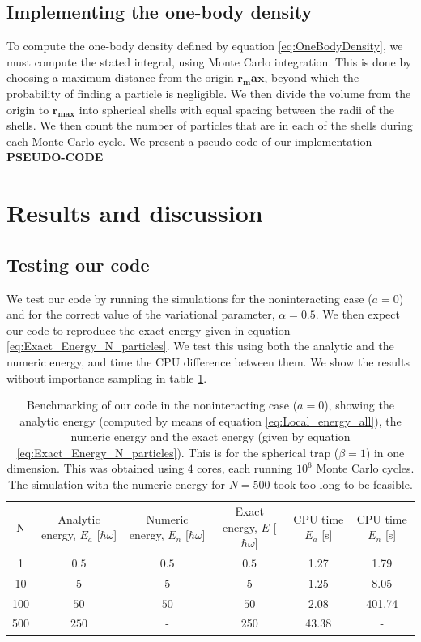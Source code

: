 \documentclass[a4paper, 10pt]{article}
\begin{document}
	\subsection{Implementing the one-body density}\label{sec:MetOneBody}
	To compute the one-body density defined by equation \ref{eq:OneBodyDensity}, we must compute the stated integral, using Monte Carlo integration. This is done by choosing a maximum distance from the origin $\boldsymbol{r_max}$, beyond which the probability of finding a particle is negligible. We then divide the volume from the origin to $\boldsymbol{r_{max}}$ into spherical shells with equal spacing between the radii of the shells. We then count the number of particles that are in each of the shells during each Monte Carlo cycle. We present a pseudo-code of our implementation \textbf{PSEUDO-CODE}	
	
	\section{Results and discussion}
	\subsection{Testing our code}
	We test our code by running the simulations for the noninteracting case ($a=0$) and for the correct value of the variational parameter, $\alpha=0.5$. We then expect our code to reproduce the exact energy given in equation \ref{eq:Exact_Energy_N_particles}. We test this using both the analytic and the numeric energy, and time the CPU difference between them. We show the results without importance sampling in table \ref{tab:4.1_benchmark_no_Green}.
	\begin{table}[ht!]
		\begin{adjustwidth}{-2cm}{}
			\begin{tabular}{cccccc}
				N & Analytic energy, $E_a$ [$\hbar \omega$] & Numeric energy, $E_n$ [$\hbar \omega$] & Exact energy, $E$ [$\hbar \omega$]& CPU time $E_a$ [s] &CPU time $E_n$ [s]\\
				1&$0.5$&$0.5$&$0.5$& 1.27&1.79\\
				10&$5$&$5$&$5$& $1.25$&8.05\\
				100&$50$&$50$&$50$&2.08&401.74\\
				500&$250$&-&250 &43.38 &-
			\end{tabular}
		\end{adjustwidth}
		\caption{Benchmarking of our code in the noninteracting case ($a=0$), showing the analytic energy (computed by means of equation \ref{eq:Local_energy_all}), the numeric energy and the exact energy (given by equation \ref{eq:Exact_Energy_N_particles}). This is for the spherical trap ($\beta=1$) in one dimension. This was obtained using $4$ cores, each running $10^6$ Monte Carlo cycles. The simulation with the numeric energy for $N=500$ took too long to be feasible.}\label{tab:4.1_benchmark_no_Green}
	\end{table}
	
\end{document}
